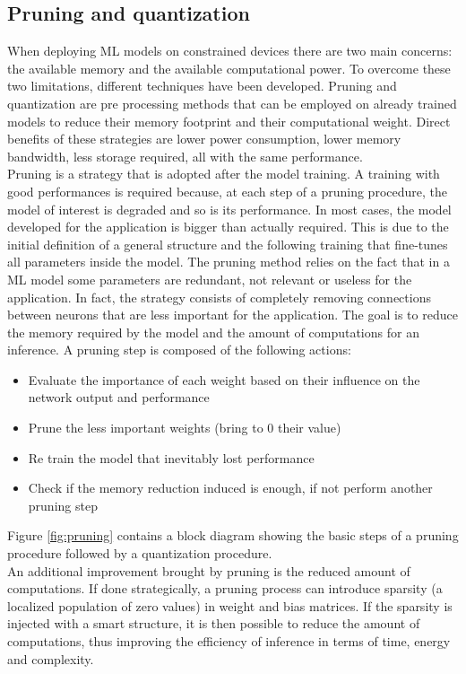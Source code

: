 \documentclass[12pt]{report}
\begin{document}
\subsection{Pruning and quantization}
When deploying ML models on constrained devices there are two main concerns: the available memory and the available computational power. To overcome these two limitations, different techniques have been developed. Pruning and quantization are pre processing methods that can be employed on already trained models to reduce their memory footprint and their computational weight. Direct benefits of these strategies are lower power consumption, lower memory bandwidth, less storage required, all with the same performance. \\
Pruning is a strategy that is adopted after the model training. A training with good performances is required because, at each step of a pruning procedure, the model of interest is degraded and so is its performance. In most cases, the model developed for the application is bigger than actually required. This is due to the initial definition of a general structure and the following training that fine-tunes all parameters inside the model. The pruning method relies on the fact that in a ML model some parameters are redundant, not relevant or useless for the application. In fact, the strategy consists of completely removing connections between neurons that are less important for the application. The goal is to reduce the memory required by the model and the amount of computations for an inference. 
A pruning step is composed of the following actions:

\begin{itemize}
\item Evaluate the importance of each weight based on their influence on the network output and performance
\item Prune the less important weights (bring to 0 their value)
\item Re train the model that inevitably lost performance
\item Check if the memory reduction induced is enough, if not perform another pruning step
\end{itemize} 

Figure \ref{fig:pruning} contains a block diagram showing the basic steps of a pruning procedure followed by a quantization procedure.\\
An additional improvement brought by pruning is the reduced amount of computations. If done strategically, a pruning process can introduce sparsity (a localized population of zero values) in weight and bias matrices. If the sparsity is injected with a smart structure, it is then possible to reduce the amount of computations, thus improving the efficiency of inference in terms of time, energy and complexity.\\
\end{document}
